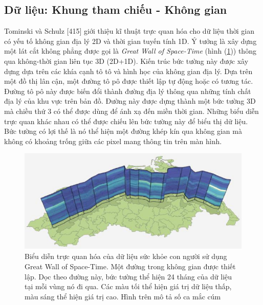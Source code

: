 \subsection{Dữ liệu: Khung tham chiếu - Không gian}
Tominski và Schulz [415] giới thiệu kĩ thuật trực quan hóa cho dữ liệu thời gian có yếu tố không gian địa lý 2D và thời gian tuyến tính 1D. Ý tưởng là xây dựng một lát cắt không phẳng được gọi là \textit{Great Wall of Space-Time} (hình (\ref{fig:f7.4})) thông qua không-thời gian liên tục 3D (2D+1D). Kiến trúc bức tường này được xây dựng dựa trên các khía cạnh tô tô và hình học của không gian địa lý. Dựa trên một đồ thị lân cận, một đường tô pô được thiết lập tự động hoặc có tương tác. Đường tô pô này được biến đổi thành đường địa lý thông qua những tính chất địa lý của khu vực trên bản đồ. Đường này được dựng thành một bức tường 3D mà chiều thứ 3 có thể được dùng để ánh xạ đến miền thời gian. Những biểu diễn trực quan khác nhau có thể được chiếu lên bức tường này để biểu thị dữ liệu. Bức tường có lợi thế là nó thể hiện một đường khép kín qua không gian mà không có khoảng trống giữa các pixel mang thông tin trên màn hình. 
\begin{figure}[H] %
    \centering %
    \includegraphics[width=1\textwidth]{assets/fig_7_4.png} 
    \caption{Biểu diễn trực quan hóa của dữ liệu sức khỏe con người sử dụng Great Wall of Space-Time. Một đường trong không gian được thiết lập. Dọc theo đường này, bức tường thể hiện 24 tháng của dữ liệu tại mỗi vùng nó đi qua. Các màu tối thể hiện giá trị dữ liệu thấp, màu sáng thể hiện giá trị cao. Hình trên mô tả số ca mắc cúm } %
    \label{fig:f7.4}
\end{figure}